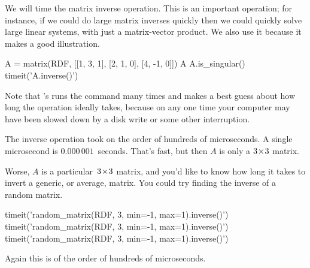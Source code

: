 We will time the matrix inverse operation.
This is an important operation; for instance, if we could do large matrix 
inverses
quickly then we could quickly solve large linear systems, 
with just a matrix-vector product.
We also use it because it makes a good illustration.
\begin{sageoutput}
A = matrix(RDF, [[1, 3, 1], [2, 1, 0], [4, -1, 0]])
A
A.is_singular()
timeit('A.inverse()')
\end{sageoutput}
\noindent
Note that \Sage's  runs the command 
many times and makes a best guess about how long
the operation ideally takes, because on any one time your
computer may have been slowed down by a 
disk write or some other interruption.

The inverse operation took on the order of hundreds of microseconds.
A single microsecond is 
$0.000\,001$~seconds.
That's fast, but then $A$ is only a $3 \! \times \! 3$ matrix.

Worse, $A$ is a particular~$3 \! \times \! 3$ matrix, and you'd like to know
how long it takes to invert a generic, or average, matrix.
You could try finding the inverse of a random matrix.
\begin{sageoutput}
timeit('random_matrix(RDF, 3, min=-1, max=1).inverse()')
timeit('random_matrix(RDF, 3, min=-1, max=1).inverse()')
timeit('random_matrix(RDF, 3, min=-1, max=1).inverse()')
\end{sageoutput}
\noindent
Again this is of the order of hundreds of microseconds.

